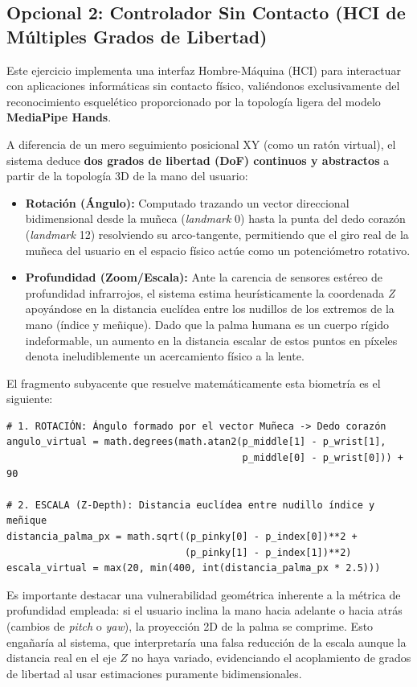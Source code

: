 \documentclass[12pt,a4paper]{article}
\begin{document}
\newpage
\subsection{Opcional 2: Controlador Sin Contacto (HCI de Múltiples Grados de Libertad)}
Este ejercicio implementa una interfaz Hombre-Máquina (HCI) para interactuar con aplicaciones informáticas sin contacto físico, valiéndonos exclusivamente del reconocimiento esquelético proporcionado por la topología ligera del modelo \textbf{MediaPipe Hands}.

A diferencia de un mero seguimiento posicional XY (como un ratón virtual), el sistema deduce \textbf{dos grados de libertad (DoF) continuos y abstractos} a partir de la topología 3D de la mano del usuario:
\begin{itemize}
    \item \textbf{Rotación (Ángulo):} Computado trazando un vector direccional bidimensional desde la muñeca (\textit{landmark} 0) hasta la punta del dedo corazón (\textit{landmark} 12) resolviendo su arco-tangente, permitiendo que el giro real de la muñeca del usuario en el espacio físico actúe como un potenciómetro rotativo.
    \item \textbf{Profundidad (Zoom/Escala):} Ante la carencia de sensores estéreo de profundidad infrarrojos, el sistema estima heurísticamente la coordenada \textit{Z} apoyándose en la distancia euclídea entre los nudillos de los extremos de la mano (índice y meñique). Dado que la palma humana es un cuerpo rígido indeformable, un aumento en la distancia escalar de estos puntos en píxeles denota ineludiblemente un acercamiento físico a la lente.
\end{itemize}

El fragmento subyacente que resuelve matemáticamente esta biometría es el siguiente:
\begin{verbatim}
# 1. ROTACIÓN: Ángulo formado por el vector Muñeca -> Dedo corazón
angulo_virtual = math.degrees(math.atan2(p_middle[1] - p_wrist[1], 
                                         p_middle[0] - p_wrist[0])) + 90

# 2. ESCALA (Z-Depth): Distancia euclídea entre nudillo índice y meñique
distancia_palma_px = math.sqrt((p_pinky[0] - p_index[0])**2 + 
                               (p_pinky[1] - p_index[1])**2)
escala_virtual = max(20, min(400, int(distancia_palma_px * 2.5)))
\end{verbatim}

Es importante destacar una vulnerabilidad geométrica inherente a la métrica de profundidad empleada: si el usuario inclina la mano hacia adelante o hacia atrás (cambios de \textit{pitch} o \textit{yaw}), la proyección 2D de la palma se comprime. Esto engañaría al sistema, que interpretaría una falsa reducción de la escala aunque la distancia real en el eje $Z$ no haya variado, evidenciando el acoplamiento de grados de libertad al usar estimaciones puramente bidimensionales.
\end{document}
